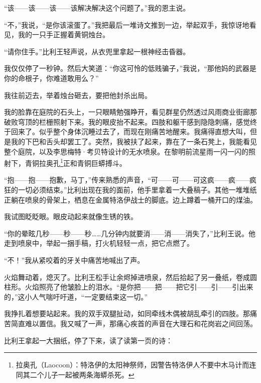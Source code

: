 \documentclass[AutoFakeBold=true]{book}
\begin{document}
``该——该——该——该解决解决这个问题了。''我的恩主说。

``不，''我说，``是你该滚蛋了。''我把最后一堆诗文推到一边，举起双手，我惊讶地看见，我的一只手正握着黄铜烛台。

``请你住手。''比利王轻声说，从衣兜里拿起一根神经击昏器。

我仅仅停了一秒钟。然后大笑道：``你这可怜的低贱骗子，''我说，``那他妈的武器是你的命根子，你难道敢用么？''

我往前迈去，举着烛台砸去，要把他封杀出局。

\vspace*{1em}

我的脸靠在庭院的石头上，一只眼睛勉强睁开，看见群星仍然透过风雨商业街廊那破败穹顶的栏栅照射下来。我的眼皮抬不起来。四肢和躯干感到隐隐刺痛，感觉终于回来了。似乎整个身体沉睡过去了，而现在刚痛苦地醒来。我痛得直想大叫，但是我的下巴和舌头却罢工了。突然，我被扶了起来，靠在了一条石凳上，我能看见整个庭院，以及李思梅特·考贝特设计的无水喷泉。在黎明前流星雨一闪一闪的照射下，青铜拉奥孔\footnote{拉奥孔（Laocoon）：特洛伊的太阳神祭师，因警告特洛伊人不要中木马计而连同其二个儿子一起被两条海蟒杀死。}正和青铜巨蟒搏斗。

``抱——抱——抱歉，马丁，''传来熟悉的声音，``可——可——可这疯——疯——疯狂的一切必须结束。''比利出现在我的面前，他手里拿着一大叠稿子。其他一堆堆纸正躺在喷泉的骨架上，栖息在金属特洛伊战士的脚底。边上蹲着一桶开口的煤油。

我试图眨眨眼。眼皮动起来就像生锈的铁。

``你的晕眩几秒——秒——秒……几分钟内就要消——消——消失了，''比利王说。他走到喷泉中，举起一捆手稿，打火机轻轻一点，把它点燃了。

``不！''我从紧咬着的牙关中痛苦地喊出了声。

火焰舞动着，熄灭了。比利王松手让余烬掉进喷泉，然后拾起了另一叠纸，卷成圆柱形。火焰照亮了他皱脸上的泪水。``是你把——把——把它引——引——引出来的，''这小人气喘吁吁道，``一定要结束这一切。''

我挣扎着想要站起来。我的双手双腿扯动，如同牵线木偶被胡乱牵引的四肢。那痛苦简直难以置信。我又喊了一声，那痛心疾首的声音在大理石和花岗岩之间回荡。

比利王拿起一大捆纸，停了下来，读了读第一页的诗：
\end{document}
